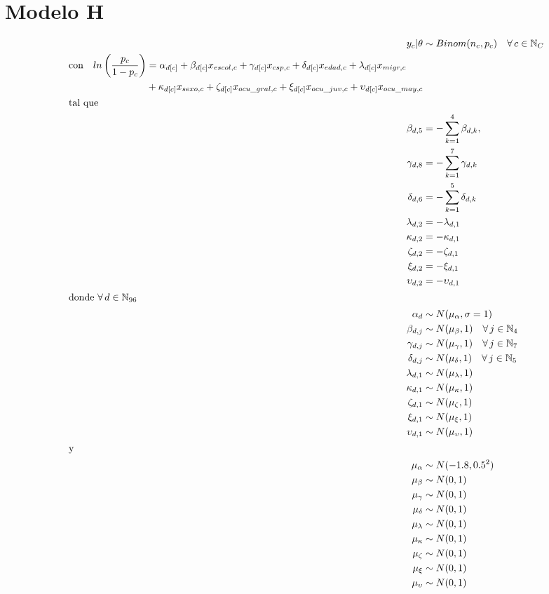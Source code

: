 \section*{Modelo H}

\begin{align}\label{eq:Modelo_Comp_H}
y_c|\theta & \sim Binom(n_c,p_c) \quad \forall \, c \in \mathbb{N}_C \nonumber \\
\begin{split}
\text{con} \quad ln\left(\dfrac{p_c}{1-p_c}\right) &= \alpha_{d[c]} + \beta_{d[c]} x_{escol,c} + \gamma_{d[c]} x_{csp,c} + \delta_{d[c]} x_{edad,c} + \lambda_{d[c]} x_{migr,c} \\
&+ \kappa_{d[c]} x_{sexo,c} + \zeta_{d[c]} x_{ocu\_gral,c} + \xi_{d[c]} x_{ocu\_juv,c} + \upsilon_{d[c]} x_{ocu\_may,c} 
\end{split}\\
\intertext{tal que} 
\beta_{d,5} &= -\sum\limits_{k = 1}^{4} \beta_{d,k}, \nonumber \\
\gamma_{d,8} &= -\sum\limits_{k = 1}^{7} \gamma_{d,k} \nonumber \\
\delta_{d,6} &= -\sum\limits_{k = 1}^{5} \delta_{d,k} \nonumber \\
\lambda_{d,2} &= -\lambda_{d,1} \nonumber \\
\kappa_{d,2} &= -\kappa_{d,1} \nonumber \\
\zeta_{d,2} &= -\zeta_{d,1} \nonumber \\
\xi_{d,2} &= -\xi_{d,1} \nonumber \\
\upsilon_{d,2} &= -\upsilon_{d,1} \nonumber \\
\intertext{donde $\forall \, d \in \mathbb{N}_{96}$}
\alpha_d &\sim N(\mu_{\alpha}, \sigma=1) \quad  \nonumber \\
\beta_{d,j} &\sim N(\mu_{\beta}, 1) \quad \forall \, j \in \mathbb{N}_{4} \nonumber \\
\gamma_{d,j} &\sim N(\mu_{\gamma}, 1) \quad \forall \, j \in \mathbb{N}_{7} \nonumber \\
\delta_{d,j} &\sim N(\mu_{\delta}, 1) \quad \forall \, j \in \mathbb{N}_{5}  \nonumber \\ 
\lambda_{d,1} &\sim N(\mu_{\lambda}, 1) \nonumber \\
\kappa_{d,1} &\sim N(\mu_{\kappa}, 1) \nonumber \\ 
\zeta_{d,1} &\sim N(\mu_{\zeta}, 1) \nonumber \\
\xi_{d,1} &\sim N(\mu_{\xi}, 1) \nonumber \\
\upsilon_{d,1} &\sim N(\mu_{\upsilon}, 1) \nonumber \\
\intertext{y}
\mu_{\alpha} &\sim N(-1.8,0.5^2) \nonumber \\
\mu_{\beta} &\sim N(0,1) \nonumber \\
\mu_{\gamma} &\sim N(0,1) \nonumber \\
\mu_{\delta} &\sim N(0,1) \nonumber \\
\mu_{\lambda} &\sim N(0,1) \nonumber \\
\mu_{\kappa} &\sim N(0,1) \nonumber \\
\mu_{\zeta} &\sim N(0,1) \nonumber \\
\mu_{\xi} &\sim N(0,1) \nonumber \\
\mu_{\upsilon} &\sim N(0,1) \nonumber
\end{align}